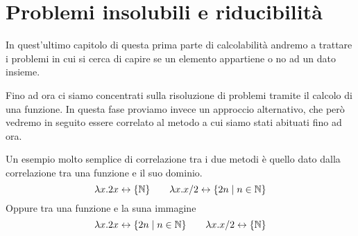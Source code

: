 \section{Problemi insolubili e riducibilità}
In quest'ultimo capitolo di questa prima parte di calcolabilità
andremo a trattare i problemi in cui si cerca di capire se un
elemento appartiene o no ad un dato insieme.

Fino ad ora ci siamo concentrati sulla risoluzione di problemi
tramite il calcolo di una funzione. In questa fase proviamo
invece un approccio alternativo, che però vedremo in seguito
essere correlato al metodo a cui siamo stati abituati fino ad
ora.

Un esempio molto semplice di correlazione tra i due metodi è
quello dato dalla correlazione tra una funzione e il suo dominio.
\[
	\lambda x . 2 x \leftrightarrow \{ \mathbb{N} \} \qquad
	\lambda x . x / 2 \leftrightarrow \{ 2n \mid n \in \mathbb{N} \}
\]
Oppure tra una funzione e la suna immagine
\[
	\lambda x . 2 x \leftrightarrow \{ 2 n \mid n \in \mathbb{N} \}
	\qquad \lambda x . x / 2 \leftrightarrow \{ \mathbb{N} \}
\]


